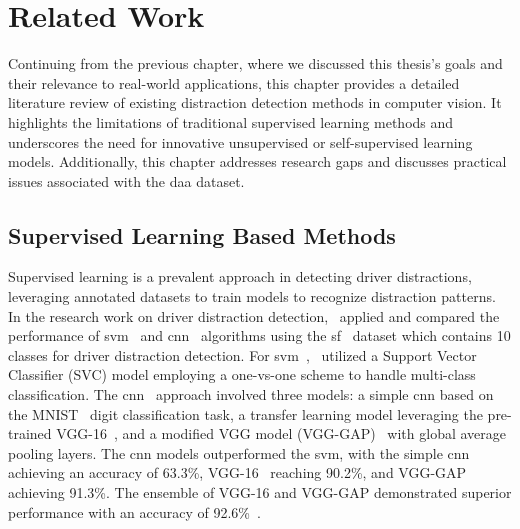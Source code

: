 \chapter{Related Work}
\label{chapter:related_work}
Continuing from the previous chapter, where we discussed this thesis's goals and their relevance to real-world applications, this chapter provides a detailed literature review of existing distraction detection methods in computer vision. It highlights the limitations of traditional supervised learning methods and underscores the need for innovative unsupervised or self-supervised learning models. Additionally, this chapter addresses research gaps and discusses practical issues associated with the \gls{daa} dataset.

\section{Supervised Learning Based Methods}
Supervised learning is a prevalent approach in detecting driver distractions, leveraging annotated datasets to
train models to recognize distraction patterns. In the research work on driver distraction detection,~\citet{58_MIM_zhang2016apply} applied and compared the performance of \gls{svm}~\citep{SVM_cortes1995support} and \gls{cnn}~\citep{CNN_o2015introduction} algorithms using the \gls{sf}~\citep{statefarm2016} dataset which contains 10 classes for driver distraction detection. For \gls{svm}~\citep{SVM_cortes1995support},~\citet{58_MIM_zhang2016apply} utilized a Support Vector Classifier (SVC) model employing a one-vs-one scheme to handle multi-class classification. The \gls{cnn}~\citep{CNN_o2015introduction} approach involved three models: a simple \gls{cnn} based on the MNIST~\citep{MNIST_dataset_deng2012mnist} digit classification task, a transfer learning model leveraging the pre-trained VGG-16~\citep{VGG_16_simonyan2014very}, and a modified VGG model (VGG-GAP)~\citep{VGG_GAP_zhou2016learning} with global average pooling layers. The \gls{cnn} models outperformed the \gls{svm}, with the simple \gls{cnn}~\citep{CNN_o2015introduction} achieving an accuracy of 63.3\%, VGG-16~\citep{VGG_16_simonyan2014very} reaching 90.2\%, and VGG-GAP~\citep{VGG_GAP_zhou2016learning} achieving 91.3\%. The ensemble of VGG-16 and VGG-GAP demonstrated superior performance with an accuracy of 92.6\%~\citep{58_MIM_zhang2016apply}.

